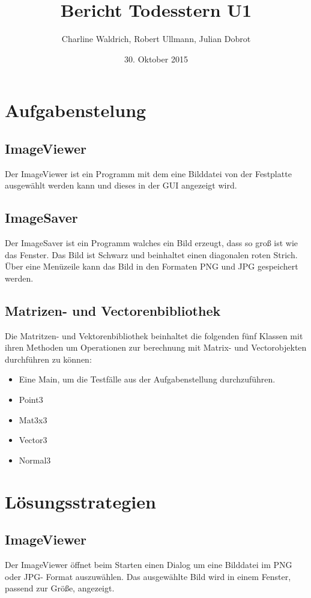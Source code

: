 \documentclass[14pt]{extarticle}
\title{Bericht Todesstern U1}
\author{Charline Waldrich, Robert Ullmann, Julian Dobrot}
\date{30. Oktober 2015}
\begin{document}
\maketitle
\pagebreak
\tableofcontents


\section{Aufgabenstelung}

\subsection{ImageViewer}
Der ImageViewer ist ein Programm mit dem eine Bilddatei von der Festplatte ausgewählt werden kann und dieses in der GUI angezeigt wird. 
\subsection{ImageSaver}
Der ImageSaver ist ein Programm walches ein Bild erzeugt, dass so groß ist wie das Fenster.
Das Bild ist Schwarz und beinhaltet einen diagonalen roten Strich. Über eine Menüzeile kann das Bild in den Formaten PNG und JPG gespeichert werden.
\subsection{Matrizen- und Vectorenbibliothek}
Die Matritzen- und Vektorenbibliothek beinhaltet die folgenden fünf Klassen mit ihren Methoden um Operationen 
zur berechnung mit Matrix- und Vectorobjekten durchführen zu können:

\begin{itemize}
\item Eine Main, um die Testfälle aus der Aufgabenstellung durchzuführen.
\item Point3
\item Mat3x3
\item Vector3 
\item Normal3
\end{itemize}


\section{Lösungsstrategien}
\subsection{ImageViewer}
Der ImageViewer öffnet beim Starten einen Dialog um eine Bilddatei im PNG oder JPG- Format auszuwählen. Das ausgewählte Bild wird in einem Fenster, passend zur Größe, angezeigt.
\end{document}
